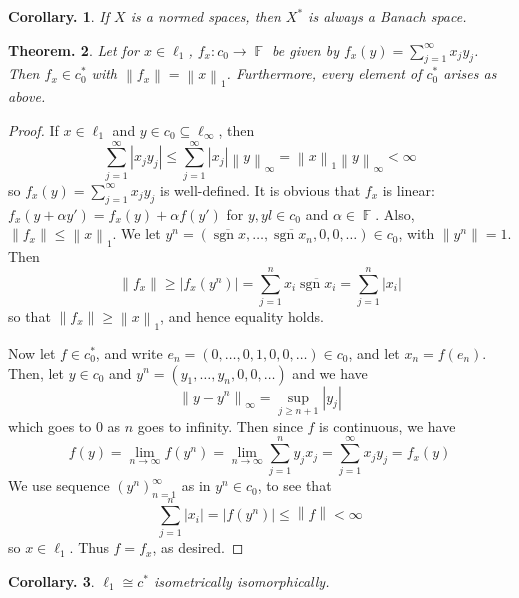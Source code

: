 \documentclass[11pt, a4paper]{memoir}
\DeclareMathOperator{\F}{{\mathbb{F}}}
\newcommand{\norm}[1]{\ensuremath{\left\lVert#1\right\rVert}}
\theoremstyle{change}
\newtheorem{theorem}{Theorem.}[section]
\newtheorem{corollary}[theorem]{Corollary.}
\theoremstyle{plain}
\theoremstyle{nonumberplain}
\newtheorem{proof}{Proof}
\DeclareMathOperator{\sgn}{sgn}
\numberwithin{equation}{section}
\begin{document}
\begin{corollary}
    If $X$ is a normed spaces, then $X^*$ is always a Banach space.
\end{corollary}
\begin{theorem}
    Let for $x\in\ell_1$, $f_x:c_0\to\F$ be given by $f_x(y)=\sum_{j=1}^\infty x_jy_j$.
    Then $f_x\in c_0^*$ with $\norm{f_x}=\norm{x}_1$.
    Furthermore, every element of $c_0^*$ arises as above.
\end{theorem}
\begin{proof}
    If $x\in\ell_1$ and $y\in c_0\subseteq\ell_\infty$, then
    \begin{equation*}
        \sum_{j=1}^\infty|x_jy_j|\leq\sum_{j=1}^\infty|x_j|\norm{y}_\infty=\norm{x}_1\norm{y}_\infty<\infty
    \end{equation*}
    so $f_x(y)=\sum_{j=1}^\infty x_jy_j$ is well-defined.
    It is obvious that $f_x$ is linear: $f_x(y+\alpha y')=f_x(y)+\alpha f(y')$ for $y,yl\in c_0$ and $\alpha\in\F$.
    Also, $\norm{f_x}\leq\norm{x}_1$.
    We let $y^{n}=(\overline{\sgn x},\ldots,\overline{\sgn x_n},0,0,\ldots)\in c_0$, with $\norm{y^n}=1$.
    Then
    \begin{equation*}
        \norm{f_x}\geq|f_x(y^n)|=\sum_{j=1}^n x_i\overline{\sgn x_i}=\sum_{j=1}^n|x_i|
    \end{equation*}
    so that $\norm{f_x}\geq\norm{x}_1$, and hence equality holds.

    Now let $f\in c_0^*$, and write $e_n=(0,\ldots,0,1,0,0,\ldots)\in c_0$, and let $x_n=f(e_n)$.
    Then, let $y\in c_0$ and $y^n=(y_1,\ldots,y_n,0,0,\ldots)$ and we have
    \begin{equation*}
        \norm{y-y^n}_\infty=\sup_{j\geq n+1}|y_j|
    \end{equation*}
    which goes to 0 as $n$ goes to infinity.
    Then since $f$ is continuous, we have
    \begin{equation*}
        f(y)=\lim_{n\to\infty}f(y^n)=\lim_{n\to\infty}\sum_{j=1}^n y_jx_j=\sum_{j=1}^\infty x_jy_j=f_x(y)
    \end{equation*}
    We use sequence $(y^n)_{n=1}^\infty$ as in $y^n\in c_0$, to see that
    \begin{equation*}
        \sum_{j=1}^n|x_i|=|f(y^n)|\leq\norm{f}<\infty
    \end{equation*}
    so $x\in\ell_1$.
    Thus $f=f_x$, as desired.
\end{proof}
\begin{corollary}
    $\ell_1\cong c^*$ isometrically isomorphically.
\end{corollary}
\end{document}
